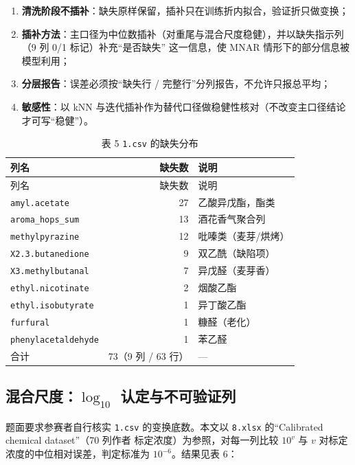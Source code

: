\documentclass[
  a4paper,12pt]{article}
\providecommand{\tightlist}{%
  \setlength{\itemsep}{0pt}\setlength{\parskip}{0pt}}
\begin{document}
\begin{enumerate}
\def\labelenumi{\arabic{enumi}.}
\tightlist
\item
  \textbf{清洗阶段不插补}：缺失原样保留，插补只在训练折内拟合，验证折只做变换；
\item
  \textbf{插补方法}：主口径为中位数插补（对重尾与混合尺度稳健），并以缺失指示列（9
  列 0/1 标记）补充``是否缺失'' 这一信息，使 MNAR
  情形下的部分信息被模型利用；
\item
  \textbf{分层报告}：误差必须按``缺失行 /
  完整行''分列报告，不允许只报总平均；
\item
  \textbf{敏感性}：以 kNN
  与迭代插补作为替代口径做稳健性核对（不改变主口径结论才可写``稳健''）。
\end{enumerate}

\begin{longtable}[]{@{}lrl@{}}
\caption{表 5 \protect\texttt{1.csv} 的缺失分布}\tabularnewline
\toprule\noalign{}
列名 & 缺失数 & 说明 \\
\midrule\noalign{}
\endfirsthead
\toprule\noalign{}
列名 & 缺失数 & 说明 \\
\midrule\noalign{}
\endhead
\bottomrule\noalign{}
\endlastfoot
\texttt{amyl.acetate} & 27 & 乙酸异戊酯，酯类 \\
\texttt{aroma\_hops\_sum} & 13 & 酒花香气聚合列 \\
\texttt{methylpyrazine} & 12 & 吡嗪类（麦芽/烘烤） \\
\texttt{X2.3.butanedione} & 9 & 双乙酰（缺陷项） \\
\texttt{X3.methylbutanal} & 7 & 异戊醛（麦芽香） \\
\texttt{ethyl.nicotinate} & 2 & 烟酸乙酯 \\
\texttt{ethyl.isobutyrate} & 1 & 异丁酸乙酯 \\
\texttt{furfural} & 1 & 糠醛（老化） \\
\texttt{phenylacetaldehyde} & 1 & 苯乙醛 \\
合计 & 73（9 列 / 63 行） & --- \\
\end{longtable}

\subsection{\texorpdfstring{混合尺度：\(\log_{10}\)
认定与不可验证列}{混合尺度：\textbackslash log\_\{10\} 认定与不可验证列}}\label{ux6df7ux5408ux5c3aux5ea6log_10-ux8ba4ux5b9aux4e0eux4e0dux53efux9a8cux8bc1ux5217}

题面要求参赛者自行核实 \texttt{1.csv} 的变换底数。本文以 \texttt{8.xlsx}
的``Calibrated chemical dataset''（70 列作者
标定浓度）为参照，对每一列比较 \(10^{v}\) 与 \(v\)
对标定浓度的中位相对误差，判定标准为 \(10^{-6}\)。结果见表 6：
\end{document}
